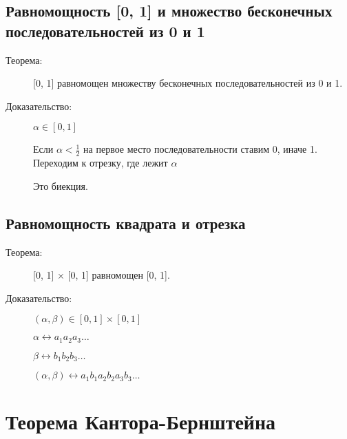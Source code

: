 \documentclass[12pt]{article}
\begin{document}
\subsection{Равномощность [0, 1] и множество бесконечных последовательностей из 0 и 1}

\begin{description}
\item[Теорема:] [0, 1] равномощен множеству бесконечных последовательностей из 0 и 1.

\item[Доказательство:]
$\alpha \in [0, 1]$

Если $\alpha < \frac{1}{2}$ на первое место последовательности ставим 0, иначе 1. Переходим к отрезку, где лежит $\alpha$

Это биекция.
\end{description}



\subsection{Равномощность квадрата и отрезка}

\begin{description}
\item[Теорема:] [0, 1] $\times$ [0, 1] равномощен [0, 1].

\item[Доказательство:]
$(\alpha, \beta) \in [0, 1] \times [0, 1]$

$\alpha \leftrightarrow a_1a_2a_3 \ldots$

$\beta \leftrightarrow b_1b_2b_3 \ldots$

$(\alpha, \beta) \leftrightarrow a_1b_1a_2b_2a_3b_3\ldots$

\end{description}

\section{Теорема Кантора-Бернштейна}
\end{document}
